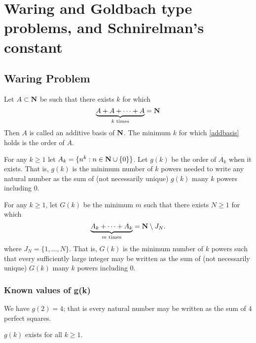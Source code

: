 \chapter{Waring and Goldbach type problems, and Schnirelman's constant}\label{waring-goldbach-schnirelman-chapter}

\section{Waring Problem}

\begin{definition}
    Let $A\subset\mathbf{N}$ be such that there exists $k$ for which
    \begin{equation}
        \underbrace{A+A+\cdots+A}_{k\text{ times}}=\mathbf{N} \label{addbasis}
    \end{equation}
    Then $A$ is called an additive basis of $\mathbf{N}$. The minimum $k$ for which \eqref{addbasis} holds is the order of $A$.
\end{definition}

\begin{definition}\label{g(k)}
For any $k\ge1$ let $A_k=\{n^k:n\in\mathbf{N}\cup\{0\}\}$. Let $g(k)$ be the order of $A_k$ when it exists.
That is, $g(k)$ is the minimum number of $k$ powers needed to write any natural number as the sum of (not necessarily unique) $g(k)$ many $k$ powers including 0.
\end{definition}

\begin{definition}\label{G(k)}
For any $k\ge1$, let $G(k)$ be the minimum $m$ such that there exists $N\ge1$ for which
$$\underbrace{A_k+\cdots+A_k}_{m\text{ times}}=\mathbf{N}\setminus J_N.$$
where $J_N=\{1,\dots,N\}$.
That is, $G(k)$ is the minimum number of $k$ powers such that every sufficiently large integer may be written as the sum of (not necessarily unique) $G(k)$ many $k$ powers including 0.
\end{definition}

\subsection{Known values of g(k)}

\begin{theorem}
We have $g(2)=4$; that is every natural number may be written as the sum of $4$ perfect squares.
\end{theorem}

\begin{theorem}
$g(k)$ exists for all $k\ge1$.
\label{HilbertExistence}
\end{theorem}


